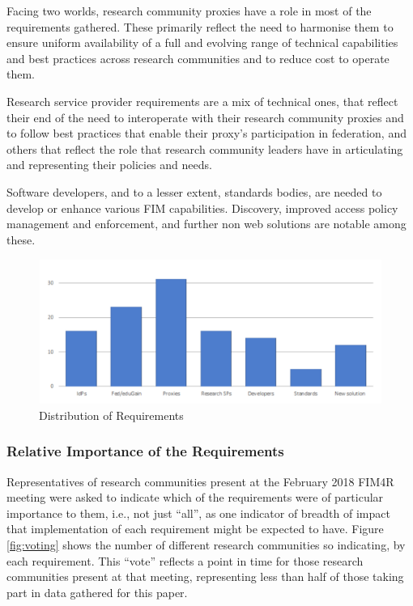 \documentclass[fleqn,11pt]{wlscirep}
\begin{document}
{Facing two worlds, research community proxies have a role in most of the requirements gathered. These primarily reflect the need to harmonise them to ensure uniform availability of a full and evolving range of technical capabilities and best practices across research communities and to reduce cost to operate them.

Research service provider requirements are a mix of technical ones, that reflect their end of the need to interoperate with their research community proxies and to follow best practices that enable their proxy’s participation in federation, and others that reflect the role that research community leaders have in articulating and representing their policies and needs.

Software developers, and to a lesser extent, standards bodies, are needed to develop or enhance various FIM capabilities. Discovery, improved access policy management and enforcement, and further non web solutions are notable among these.

\begin{figure}[ht!]
  \centering
  \includegraphics[width=0.7\columnwidth]{RequirementsBreakdown.png}
  \caption{Distribution of Requirements}
  \label{fig:breakdown}
\end{figure}

\subsubsection{Relative Importance of the Requirements}

Representatives of research communities present at the February 2018 FIM4R meeting were asked to indicate which of the requirements were of particular importance to them, i.e., not just “all”, as one indicator of breadth of impact that implementation of each requirement might be expected to have. Figure \ref{fig:voting} shows the number of different research communities so indicating, by each requirement. This “vote” reflects a point in time for those research communities present at that meeting, representing less than half of those taking part in data gathered for this paper.

}
\end{document}
